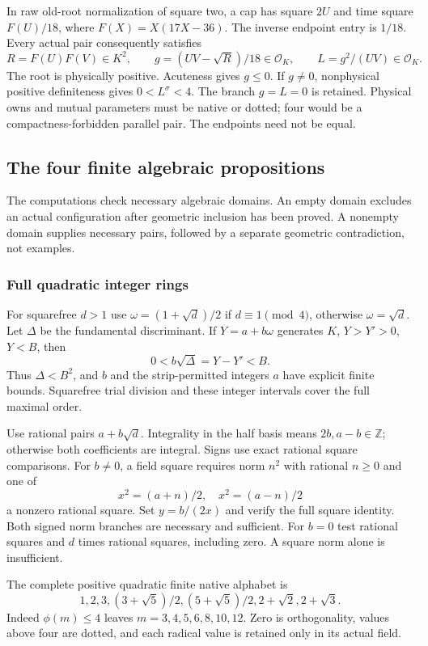 \documentclass[11pt]{article}
\theoremstyle{remark}\newtheorem{remark}[theorem]{Remark}
\numberwithin{equation}{section}
\newcommand{\Z}{\mathbb Z}
\newcommand{\OK}{\mathcal O_K}
\begin{document}
In raw old-root normalization of square two, a cap has square $2U$
and time square $F(U)/18$, where $F(X)=X(17X-36)$.
The inverse endpoint entry is $1/18$. Every actual pair consequently
satisfies
 \begin{equation}\label{eq:a17cycles}
 R=F(U)F(V)\in K^2,\qquad
 g=(UV-\sqrt R)/18\in\OK,\qquad L=g^2/(UV)\in\OK.
\end{equation}
The root is physically positive. Acuteness gives $g\le0$.
If $g\ne0$, nonphysical positive definiteness gives $0<L^\sigma<4$.
The branch $g=L=0$ is retained. Physical owns and mutual parameters
must be native or dotted; four would be a compactness-forbidden
parallel pair. The endpoints need not be equal.


\subsection{The four finite algebraic propositions}\label{arith:sec:algorithms}

The computations check necessary algebraic domains. An empty domain
excludes an actual configuration after geometric inclusion has been
proved. A nonempty domain supplies necessary pairs, followed by a
separate geometric contradiction, not examples.

\subsubsection{Full quadratic integer rings}
For squarefree $d>1$ use $\omega=(1+\sqrt d)/2$ if
 $d\equiv1\pmod4$, otherwise $\omega=\sqrt d$.
Let $\Delta$ be the fundamental discriminant.
If $Y=a+b\omega$ generates $K$, $Y>Y'>0$, $Y<B$, then
 \[
 0<b\sqrt\Delta=Y-Y'<B.
\]
Thus $\Delta<B^2$, and $b$ and the strip-permitted integers $a$
have explicit finite bounds. Squarefree trial division and these
integer intervals cover the full maximal order.

Use rational pairs $a+b\sqrt d$. Integrality in the half basis means
 $2b,a-b\in\Z$; otherwise both coefficients are integral.
Signs use exact rational square comparisons.
For $b\ne0$, a field square requires norm $n^2$ with rational
 $n\ge0$ and one of
 \[
 x^2=(a+n)/2,\quad x^2=(a-n)/2
\]
a nonzero rational square. Set $y=b/(2x)$ and verify the full
square identity. Both signed norm branches are necessary and
sufficient. For $b=0$ test rational squares and $d$ times rational
squares, including zero. A square norm alone is insufficient.

The complete positive quadratic finite native alphabet is
 \[
 1,2,3,(3+\sqrt5)/2,(5+\sqrt5)/2,2+\sqrt2,2+\sqrt3.
\]
Indeed $\phi(m)\le4$ leaves $m=3,4,5,6,8,10,12$.
Zero is orthogonality, values above four are dotted, and each
radical value is retained only in its actual field.
\end{document}
